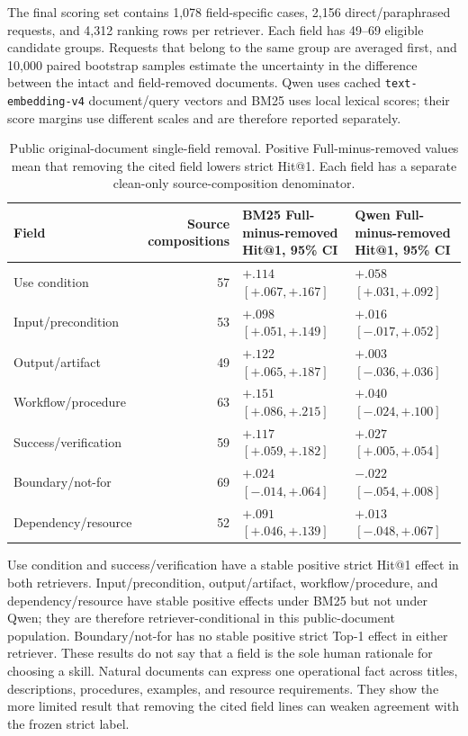 The final scoring set contains 1,078 field-specific cases, 2,156 direct/paraphrased requests, and 4,312 ranking rows per retriever. Each field has 49--69 eligible candidate groups. Requests that belong to the same group are averaged first, and 10,000 paired bootstrap samples estimate the uncertainty in the difference between the intact and field-removed documents. Qwen uses cached \texttt{text-embedding-v4} document/query vectors and BM25 uses local lexical scores; their score margins use different scales and are therefore reported separately.

\begin{table}[H]
\centering
\scriptsize
\setlength{\tabcolsep}{3pt}
\begin{tabular}{p{}rp{}p{}}
\toprule
Field & Source compositions & BM25 Full-minus-removed Hit@1, 95\% CI & Qwen Full-minus-removed Hit@1, 95\% CI \\
\midrule
Use condition & 57 & $+.114$ $[+.067,+.167]$ & $+.058$ $[+.031,+.092]$ \\
Input/precondition & 53 & $+.098$ $[+.051,+.149]$ & $+.016$ $[-.017,+.052]$ \\
Output/artifact & 49 & $+.122$ $[+.065,+.187]$ & $+.003$ $[-.036,+.036]$ \\
Workflow/procedure & 63 & $+.151$ $[+.086,+.215]$ & $+.040$ $[-.024,+.100]$ \\
Success/verification & 59 & $+.117$ $[+.059,+.182]$ & $+.027$ $[+.005,+.054]$ \\
Boundary/not-for & 69 & $+.024$ $[-.014,+.064]$ & $-.022$ $[-.054,+.008]$ \\
Dependency/resource & 52 & $+.091$ $[+.046,+.139]$ & $+.013$ $[-.048,+.067]$ \\
\bottomrule
\end{tabular}
\caption{Public original-document single-field removal. Positive Full-minus-removed values mean that removing the cited field lowers strict Hit@1. Each field has a separate clean-only source-composition denominator.}
\label{tab:rq1-public-original-single-field}
\end{table}

Use condition and success/verification have a stable positive strict Hit@1 effect in both retrievers. Input/precondition, output/artifact, workflow/procedure, and dependency/resource have stable positive effects under BM25 but not under Qwen; they are therefore retriever-conditional in this public-document population. Boundary/not-for has no stable positive strict Top-1 effect in either retriever. These results do not say that a field is the sole human rationale for choosing a skill. Natural documents can express one operational fact across titles, descriptions, procedures, examples, and resource requirements. They show the more limited result that removing the cited field lines can weaken agreement with the frozen strict label.

